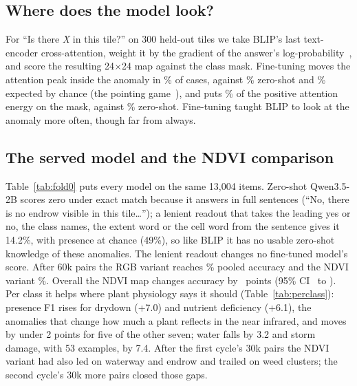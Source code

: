 \documentclass[10pt,twocolumn]{article}
\begin{document}
\subsection{Where does the model look?}
For ``Is there \emph{X} in this tile?'' on 300 held-out tiles we take BLIP's last text-encoder cross-attention, weight it by the gradient of the answer's log-probability~\cite{selvaraju2017gradcam}, and score the resulting 24$\times$24 map against the class mask. Fine-tuning moves the attention peak inside the anomaly in \pointLora\% of cases, against \pointZero\% zero-shot and \pointChance\% expected by chance (the pointing game~\cite{zhang2018topdown}), and puts \energyLora\% of the positive attention energy on the mask, against \energyZero\% zero-shot. Fine-tuning taught BLIP to look at the anomaly more often, though far from always.

\subsection{The served model and the NDVI comparison}
\begin{table}[t]\centering\small
\resizebox{\textwidth}{!}{}
\caption{Every model on the same fold-0 items (\%): accuracy per question type, pooled accuracy with a field-grouped 95\% interval, the paired difference against BLIP-LoRA, and caption fact F1 with precision and recall; a mean in brackets is the lenient readout of free-text answers. Rows marked v1 are the first cycle's records on the same items; BLIP-DoRA, trained only in the first cycle, is paired with the v1 LoRA row. The last row is the paired NDVI minus RGB difference.}\label{tab:fold0}
\end{table}
\begin{table}[t]\centering\small
\resizebox{\columnwidth}{!}{}
\caption{Presence F1 (\%) per class on fold 0. $^\dagger$Under 60 present examples.}\label{tab:perclass}
\end{table}
Table~\ref{tab:fold0} puts every model on the same 13,004 items. Zero-shot Qwen3.5-2B scores zero under exact match because it answers in full sentences (``No, there is no endrow visible in this tile\ldots''); a lenient readout that takes the leading yes or no, the class names, the extent word or the cell word from the sentence gives it 14.2\%, with presence at chance (49\%), so like BLIP it has no usable zero-shot knowledge of these anomalies. The lenient readout changes no fine-tuned model's score. After 60k pairs the RGB variant reaches \qwenRgbPooled\% pooled accuracy and the NDVI variant \qwenNdviPooled\%. Overall the NDVI map changes accuracy by \ndviDiff\ points (95\% CI \ndviLo\ to \ndviHi). Per class it helps where plant physiology says it should (Table~\ref{tab:perclass}): presence F1 rises for drydown (+7.0) and nutrient deficiency (+6.1), the anomalies that change how much a plant reflects in the near infrared, and moves by under 2 points for five of the other seven; water falls by 3.2 and storm damage, with 53 examples, by 7.4. After the first cycle's 30k pairs the NDVI variant had also led on waterway and endrow and trailed on weed clusters; the second cycle's 30k more pairs closed those gaps.
\end{document}
